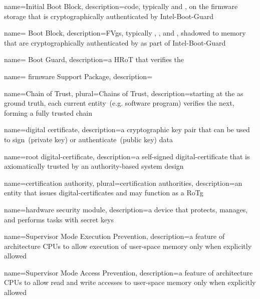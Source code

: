 {
  name={Initial Boot Block},
  description={code, typically  and , on the \gls{firmware} storage that is cryptographically authenticated by \gls{Intel-Boot-Guard}}
}

{
  name={ Boot Block},
  description={\glspl{FVg}, typically , , and , shadowed to memory that are cryptographically authenticated by  as part of \gls{Intel-Boot-Guard}}
}

{
  name={ Boot Guard},
  description={a \gls{HRoT} that verifies the }
}

{
  name={ \Gls{firmware} Support Package},
  description={}
}

{
  name={Chain of Trust},
  plural={Chains of Trust},
  description={starting at the  as ground truth, each current entity~(e.g. software program) verifies the next, forming a fully trusted chain}
}

{
  name={digital certificate},
  description={a cryptographic key pair that can be used to sign~(private key) or authenticate~(public key) data}
}

{
  name={root \gls{digital-certificate}},
  description={a self-signed \gls{digital-certificate} that is axiomatically trusted by an authority-based system design}
}

{
  name={certification authority},
  plural={certification authorities},
  description={an entity that issues \glspl{digital-certificate} and may function as a \gls{RoTg}}
}

{
  name={hardware security module},
  description={a device that protects, manages, and performs tasks with secret keys}
}

{
  name={Supervisor Mode Execution Prevention},
  description={a feature of  architecture \glspl{CPU} to allow execution of \gls{user-space} memory only when explicitly allowed}
}

{
  name={Supervisor Mode Access Prevention},
  description={a feature of  architecture \glspl{CPU} to allow read and write accesses to \gls{user-space} memory only when explicitly allowed}
}

